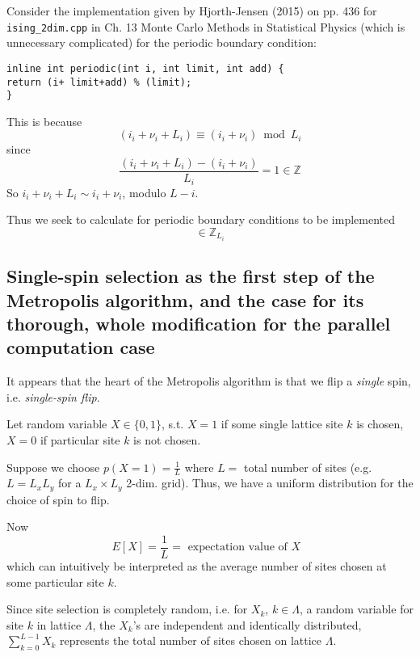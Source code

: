 \documentclass[10pt]{amsart}
\begin{document}
\begin{multicols*}{2}
Consider the implementation given by Hjorth-Jensen (2015) \cite{Hjor2015} on pp. 436 for \verb|ising_2dim.cpp| in Ch. 13 Monte Carlo Methods in Statistical Physics (which is unnecessary complicated) for the periodic boundary condition: 
\begin{lstlisting}
inline int periodic(int i, int limit, int add) {
return (i+ limit+add) % (limit); 
}
\end{lstlisting}
This is because 
\[
(i_i + \nu_i + L_i ) \equiv (i_i + \nu_i) \bmod{L_i}
\] since 
\[
\frac{ (i_i + \nu_i + L_i) - (i_i + \nu_i) }{ L_i } = 1 \in \mathbb{Z} 
\]
So $i_i + \nu_i + L_i \sim i_i + \nu_i$, modulo $L-i$.  

Thus we seek to calculate for periodic boundary conditions to be implemented
\begin{equation}
[i_i + \nu_i ] \in \mathbb{Z}_{L_i}
\end{equation}


\subsection{Single-spin selection as the first step of the Metropolis algorithm, and the case for its thorough, whole modification for the parallel computation case}  

It appears that the heart of the Metropolis algorithm is that we flip a \emph{single} spin, i.e. \emph{single-spin flip}.  

Let random variable $X  \in \lbrace 0,1\rbrace$, s.t. $X=1$ if some single lattice site $k$ is chosen, $X=0$ if particular site $k$ is not chosen.  

Suppose we choose $p(X=1) = \frac{1}{L}$ where $L= $ total number of sites (e.g. $L=L_xL_y$ for a $L_x \times L_y$ 2-dim. grid).  Thus, we have a uniform distribution for the choice of spin to flip.  

Now
\[
E[X] = \frac{1}{L} = \text{ expectation value of $X$ }
\]
which can intuitively be interpreted as the average number of sites chosen at some particular site $k$.  

Since site selection is completely random, i.e. for $X_k$, $k\in \Lambda$, a random variable for site $k$ in lattice $\Lambda$, the $X_k$'s are independent and identically distributed, $\sum_{k=0}^{L-1} X_k $ represents the total number of sites chosen on lattice $\Lambda$.  


\end{multicols*}
\end{document}
